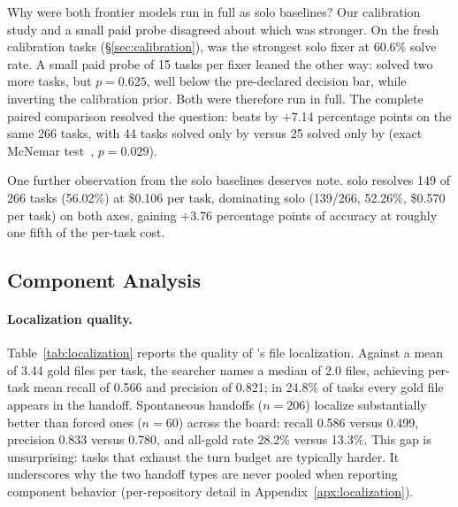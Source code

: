 Why were both frontier models run in full as solo baselines?  Our
calibration study and a small paid probe disagreed about which was
stronger.  On the fresh calibration tasks (\S\ref{sec:calibration}),
\fxgpt was the strongest solo fixer at 60.6\% solve rate.  A small paid
probe of 15 tasks per fixer leaned the other way: \fxopus solved two
more tasks, but $p{=}0.625$, well below the pre-declared decision bar,
while inverting the calibration prior.  Both were therefore run in full.
The complete paired comparison resolved the question: \fxopus beats
\fxgpt by $+$7.14 percentage points on the same 266 tasks, with 44
tasks solved only by \fxopus versus 25 solved only by \fxgpt (exact
McNemar test~\citep{mcnemar}, $p{=}0.029$).

One further observation from the solo baselines deserves note.
\fxkimi solo resolves 149 of 266 tasks (56.02\%) at \$0.106 per task,
dominating \fxgpt solo (139/266, 52.26\%, \$0.570 per task) on both
axes, gaining $+$3.76 percentage points of accuracy at roughly one fifth
of the per-task cost.

\subsection{Component Analysis}
\label{sec:results-components}

\paragraph{Localization quality.}

\begin{table}[!tbp]
\centering
\caption{\textbf{\modelname's file localization on SWE-bench Pro
(Python-266).}  Per-task mean recall and precision against the gold
patch's file set.  Spontaneous and forced handoffs are reported
separately.  All numbers are from a single sampled draw at
temperature~$0.9$ (no majority vote).}
\label{tab:localization}

\end{table}

Table~\ref{tab:localization} reports the quality of \modelname's file
localization.
Against a mean of 3.44 gold files per task, the searcher names a median
of 2.0 files, achieving per-task mean recall of 0.566 and precision of
0.821; in 24.8\% of tasks every gold file appears in the handoff.
Spontaneous handoffs ($n{=}206$) localize substantially better than
forced ones ($n{=}60$) across the board: recall 0.586 versus 0.499,
precision 0.833 versus 0.780, and all-gold rate 28.2\% versus 13.3\%.
This gap is unsurprising: tasks that exhaust the turn budget are
typically harder.  It underscores why the two handoff types are
never pooled when reporting component behavior (per-repository detail in Appendix~\ref{apx:localization}).

